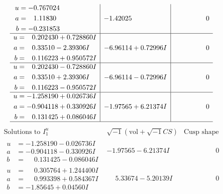 \documentclass[1p]{elsarticle_modified}
\theoremstyle{definition}
\newcommand{\I}{\sqrt{-1}}
\begin{document}
$$\begin{array}{c|c|c}
\begin{aligned}
u &= -0.767024\phantom{ +0.000000I} \\
a &= \phantom{-}1.11830\phantom{ +0.000000I} \\
b &= -0.231853\phantom{ +0.000000I}\end{aligned}
 & -1.42025\phantom{ +0.000000I} & \phantom{-0.000000 } 0 \\ \hline\begin{aligned}
u &= \phantom{-}0.202430 + 0.728860 I \\
a &= \phantom{-}0.33510 - 2.39306 I \\
b &= \phantom{-}0.116223 + 0.950572 I\end{aligned}
 & -6.96114 + 0.72996 I & \phantom{-0.000000 } 0 \\ \hline\begin{aligned}
u &= \phantom{-}0.202430 - 0.728860 I \\
a &= \phantom{-}0.33510 + 2.39306 I \\
b &= \phantom{-}0.116223 - 0.950572 I\end{aligned}
 & -6.96114 - 0.72996 I & \phantom{-0.000000 } 0 \\ \hline\begin{aligned}
u &= -1.258190 + 0.026736 I \\
a &= -0.904118 + 0.330926 I \\
b &= \phantom{-}0.131425 + 0.086046 I\end{aligned}
 & -1.97565 + 6.21374 I & \phantom{-0.000000 } 0\\
 \hline 
 \end{array}$$\newpage$$\begin{array}{c|c|c}  
\text{Solutions to }I^u_{1}& \I (\text{vol} + \sqrt{-1}CS) & \text{Cusp shape}\\
 \hline 
\begin{aligned}
u &= -1.258190 - 0.026736 I \\
a &= -0.904118 - 0.330926 I \\
b &= \phantom{-}0.131425 - 0.086046 I\end{aligned}
 & -1.97565 - 6.21374 I & \phantom{-0.000000 } 0 \\ \hline\begin{aligned}
u &= \phantom{-}0.305764 + 1.244400 I \\
a &= \phantom{-}0.993398 + 0.584367 I \\
b &= -1.85645 + 0.04560 I\end{aligned}
 & \phantom{-}5.33674 - 5.20139 I & \phantom{-0.000000 } 0 \\ \hline\begin{aligned}

\end{aligned}
\end{array}$$
\end{document}
